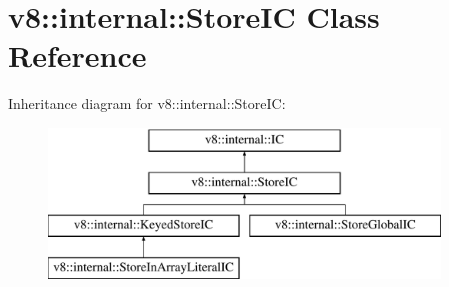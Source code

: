 \hypertarget{classv8_1_1internal_1_1StoreIC}{}\section{v8\+:\+:internal\+:\+:Store\+IC Class Reference}
\label{classv8_1_1internal_1_1StoreIC}
Inheritance diagram for v8\+:\+:internal\+:\+:Store\+IC\+:\begin{figure}[H]
\begin{center}
\leavevmode
\includegraphics[height=4.000000cm]{classv8_1_1internal_1_1StoreIC}
\end{center}
\end{figure}
